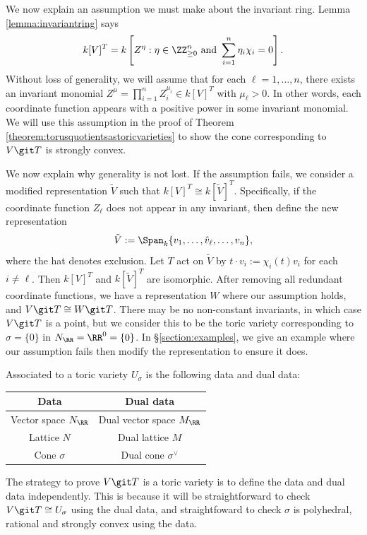 \documentclass[12pt]{amsart}
\theoremstyle{plain}
\theoremstyle{definition}
\begin{document}
We now explain an assumption we must make about the invariant ring.
Lemma \ref{lemma:invariantring} says 
$$k[V]^T = k \left[Z^\eta : \eta \in \ZZ_{\ge 0}^n \text{ and } \sum_{i=1}^n \eta_i \chi_i = 0 \right].$$
Without loss of generality, we will assume that for each $\ell = 1, \ldots, n$, there exists an invariant monomial $Z^\mu = \prod_{i=1}^n Z_i^{\mu_i} \in k[V]^T$ with $\mu_\ell > 0$.
In other words, each coordinate function appears with a positive power in some invariant monomial.
We will use this assumption in the proof of Theorem \ref{theorem:torusquotientsastoricvarieties} to show the cone corresponding to $V \git T$ is strongly convex.

We now explain why generality is not lost.
If the assumption fails, we consider a modified representation $\tilde V$ such that $k[V]^T \cong k[\tilde V]^T$.
Specifically, if the coordinate function $Z_\ell$ does not appear in any invariant, then define the new representation
$$\tilde V := \Span_{k}\{v_1, \ldots, \hat v_\ell, \ldots, v_n\},$$
where the hat denotes exclusion.
Let $T$ act on $\tilde V$ by $t \cdot v_i := \chi_i(t) v_i$ for each $i \ne \ell$.
Then $k[V]^T$ and $k[\tilde V]^T$ are isomorphic.
After removing all redundant coordinate functions, we have a representation $W$ where our assumption holds, and $V \git T \cong W \git T$.
There may be no non-constant invariants, in which case $V \git T$ is a point, but we consider this to be the toric variety corresponding to $\sigma = \{0\}$ in $N_\RR = \RR^0 =\{0\}$.
In \S \ref{section:examples}, we give an example where our assumption fails then modify the representation to ensure it does.

Associated to a toric variety $U_\sigma$ is the following data and dual data:
\begin{center}
\begin{tabular}{c | c}
	Data & Dual data \\
	\hline
	Vector space $N_\RR$ & Dual vector space $M_\RR$ \\
	Lattice $N$ & Dual lattice $M$ \\
	Cone $\sigma$ & Dual cone $\sigma^\vee$
\end{tabular}
\end{center}
\noindent
The strategy to prove $V \git T$ is a toric variety is to define the data and dual data independently.
This is because it will be straightforward to check $V \git T \cong U_\sigma$ using the dual data, and straightfoward to check $\sigma$ is polyhedral, rational and strongly convex using the data.
\end{document}
